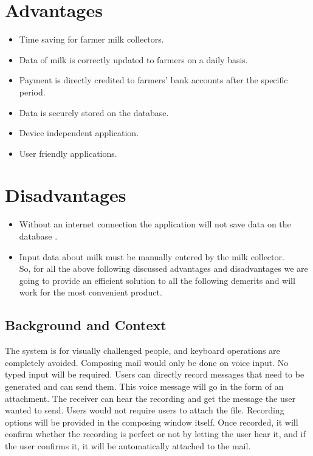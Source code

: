 \documentclass[english]{article}
\begin{document}
\section*{Advantages} %
\begin{itemize}
\item Time saving for farmer milk collectors.
\item Data of milk is correctly updated to farmers on a daily basis.
\item Payment is directly credited to farmers' bank accounts after the specific 
 period.
\item Data is securely stored on the database.
\item  Device independent application.
\item User friendly applications.
\end{itemize}

\section*{Disadvantages} %
\begin{itemize}
\item Without an internet connection the application will not save data on the
database .
\item Input data about milk must be manually entered by the milk collector.\\

So, for all the above following discussed advantages and disadvantages we are going to provide an efficient solution to all the following demerits and will work for the most convenient product.
\end{itemize}

\subsection{Background and Context}
The system is for visually challenged people, and keyboard operations are completely avoided. Composing mail would only be done on voice input. No typed input will be required. Users can directly record messages that need to be generated and can send them. This voice message will go in the form of an attachment. The receiver can hear the recording and get the message the user wanted to send. Users would not require users to attach the file. Recording options will be provided in the composing window itself. Once recorded, it will confirm whether the recording is perfect or not by letting the user hear it, and if the user confirms it, it will be automatically attached to the mail. 
\end{document}
